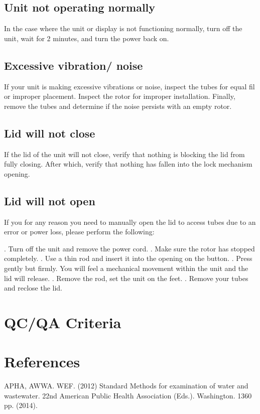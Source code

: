 \documentclass[12pt]{../SOP3_beta}
\begin{document}
\subsection*{Unit not operating normally}

\NP In the case where the unit or display is not functioning normally, turn off the unit, wait for 2 minutes, and turn the power back on. 

\subsection*{Excessive vibration/ noise}

\NP If your unit is making excessive vibrations or noise, inspect the tubes for equal fil or improper placement. Inspect the rotor for improper installation. Finally, remove the tubes and determine if the noise persists with an empty rotor. 

\subsection*{Lid will not close}

\NP If the lid of the unit will not close, verify that nothing is blocking the lid from fully closing. After which, verify that nothing has fallen into the lock mechanism opening. 

\subsection*{Lid will not open}

\NP If you for any reason you need to manually open the lid to access tubes due to an error or power loss, please perform the following:

. Turn off the unit and remove the power cord.
. Make sure the rotor has stopped completely.
. Use a thin rod and insert it into the opening on the button.
. Press gently but firmly. You will feel a mechanical movement within the unit and the lid will release.
. Remove the rod, set the unit on the feet.
. Remove your tubes and reclose the lid. 

\section{QC/QA Criteria}

\section{References}

\NP APHA, AWWA. WEF. (2012) Standard Methods for examination of water and wastewater. 22nd American Public Health Association (Eds.). Washington. 1360 pp. (2014).
\end{document}
